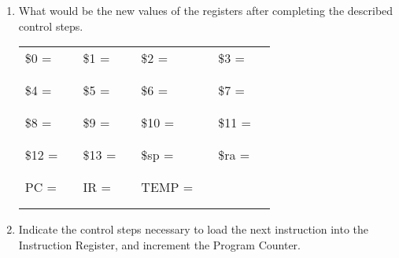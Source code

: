 \documentclass[a4paper,10pt]{article}
\begin{document}
\begin{enumerate}
\begin{enumerate}
\item What would be the new values of the registers after completing the described control steps.
\begin{center}
\begin{tabular}{|lp{1.5cm}|lp{1.5cm}|lp{1.5cm}|lp{1.5cm}|}
\hline
\$0 = & & \$1 = & & \$2 = & & \$3 = &  \\
& & & & & & & \\
& & & & & & & \\
\hline
\$4 = & & \$5 = & & \$6 = & & \$7 = & \\
& & & & & & & \\
& & & & & & & \\
\hline
\$8 = & & \$9 = & & \$10 = & & \$11 = & \\
& & & & & & & \\
& & & & & & & \\
\hline
\$12 = & & \$13 = & & \$sp = & & \$ra = & \\
& & & & & & & \\
& & & & & & & \\
\hline
PC = & & IR = & & TEMP = & &  & \\
& & & & & & & \\
& & & & & & & \\
\hline
\end{tabular}
\end{center}

\item Indicate the control steps necessary to load the next instruction into the Instruction Register, and increment the Program Counter.


\end{enumerate}
\end{enumerate}
\end{document}

